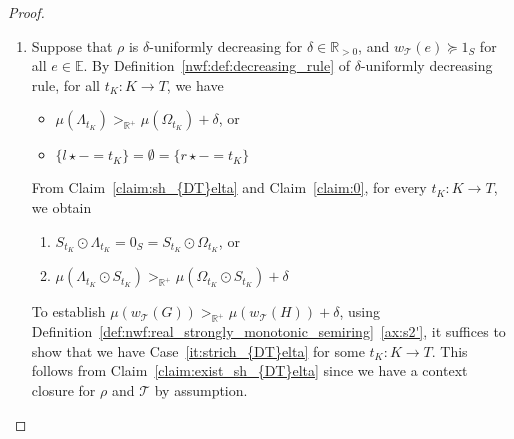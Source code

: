 \begin{proof}
\begin{enumerate}
        \item  
            Suppose that $\rho$ is $\delta$-uniformly decreasing for $\delta \mathop{\in} \mathbb{R}_{>0}$, and $w_\mathcal{T}(e) \mathop{\succeq} 1_S$ for all $e \mathop{\in} \mathbb{E}$. By Definition~\ref{nwf:def:decreasing_rule} of $\delta$-uniformly decreasing rule,
            for all $t_K : K \mathop{\to} T$, we have  
                            \begin{itemize}                                
                                \item $\mu(\Lambda_{t_K}) >_{\mathbb{R}^+} \mu(\Omega_{t_K})\mathop{+}\delta$,
                                 or
                                \item $\{l \mathop{\star} - \mathop{=} t_K\} \mathop{=} \emptyset \mathop{=} \{r \mathop{\star} - \mathop{=} t_K\}$
                            \end{itemize}
            From Claim~\ref{claim:sh_{DT}elta} and Claim~\ref{claim:0}, for every \( t_K: K \mathop{\rightarrow} T \), we obtain
            \begin{enumerate}[label=(\roman*)]
                \item $S_{t_K} \mathop{\odot} \Lambda_{t_K} \mathop{=} 0_S \mathop{=}  S_{t_K} \mathop{\odot} \Omega_{t_K}$, or
                \item  \label{it:strich_{DT}elta}  $\mu(\Lambda_{t_K} \mathop{\odot} S_{t_K}) >_{\mathbb{R}^+} \mu(\Omega_{t_K} \mathop{\odot} S_{t_K})\mathop{+}\delta$
            \end{enumerate}
            To establish $ \mu(w_\mathcal{T}(G)) >_{\mathbb{R}^+} \mu(w_\mathcal{T}(H))\mathop{+}\delta$, using Definition~\ref{def:nwf:real_strongly_monotonic_semiring}~\eqref{ax:s2'}, 
            it suffices to show that we have Case~\ref{it:strich_{DT}elta} for some $t_K : K \mathop{\to} T$.
            This follows from Claim~\ref{claim:exist_sh_{DT}elta} since we have a context closure for $\rho$ and $\mathcal{T}$ by assumption.

\end{enumerate}
\end{proof}
